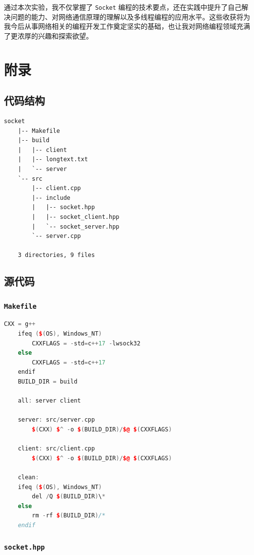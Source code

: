 \documentclass{article}
\begin{document}
通过本次实验，我不仅掌握了 \texttt{Socket} 编程的技术要点，还在实践中提升了自己解决问题的能力、对网络通信原理的理解以及多线程编程的应用水平。这些收获将为我今后从事网络相关的编程开发工作奠定坚实的基础，也让我对网络编程领域充满了更浓厚的兴趣和探索欲望。

\section{附录}

\subsection{代码结构}

\begin{lstlisting}[numbers=none]
    socket
    |-- Makefile
    |-- build
    |   |-- client
    |   |-- longtext.txt
    |   `-- server
    `-- src
        |-- client.cpp
        |-- include
        |   |-- socket.hpp
        |   |-- socket_client.hpp
        |   `-- socket_server.hpp
        `-- server.cpp
    
    3 directories, 9 files
\end{lstlisting}

\subsection{源代码}

\subsubsection{\texttt{Makefile}}

\begin{lstlisting}[language=C++]
    CXX = g++
    ifeq ($(OS), Windows_NT)
        CXXFLAGS = -std=c++17 -lwsock32
    else
        CXXFLAGS = -std=c++17
    endif
    BUILD_DIR = build
    
    all: server client
    
    server: src/server.cpp
        $(CXX) $^ -o $(BUILD_DIR)/$@ $(CXXFLAGS)
    
    client: src/client.cpp
        $(CXX) $^ -o $(BUILD_DIR)/$@ $(CXXFLAGS)
    
    clean:
    ifeq ($(OS), Windows_NT)
        del /Q $(BUILD_DIR)\*
    else
        rm -rf $(BUILD_DIR)/*
    endif
\end{lstlisting}

\subsubsection{\texttt{socket.hpp}}
\end{document}
